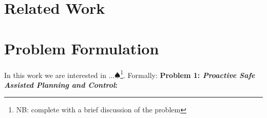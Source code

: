 \documentclass[conference]{IEEEtran}
\newcommand\NB[1]{$\spadesuit$\footnote{NB: #1}}
\begin{document}
    

\section{Related Work}

    
    
    
    
    
\section{Problem Formulation}
 
In this work we are interested in ...\NB{complete with a brief discussion of the problem}. Formally: 
\textbf{Problem 1: \textit{Proactive Safe Assisted Planning and Control}:} 
    
\end{document}
